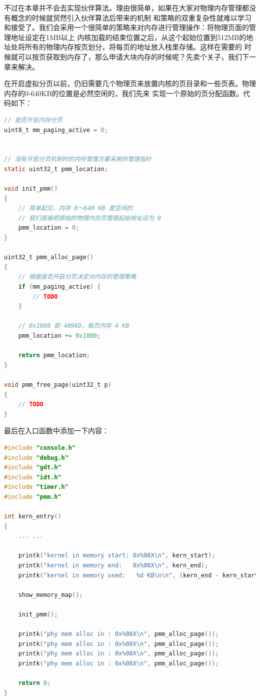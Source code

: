 \par 不过在本章并不会去实现伙伴算法。理由很简单，如果在大家对物理内存管理都没有概念的时候就贸然引入伙伴算法后带来的机制\allowbreak
和策略的双重复杂性就难以学习和接受了。我们会采用一个很简单的策略来对内存进行管理操作：将物理页面的管理地址设定在1MB以上\allowbreak
内核加载的结束位置之后，从这个起始位置到512MB的地址处将所有的物理内存按页划分，将每页的地址放入栈里存储。这样在需要的\allowbreak
时候就可以按页获取到内存了，那么申请大块内存的时候呢？先卖个关子，我们下一章来解决。

\par 在开启虚拟分页以前，仍旧需要几个物理页来放置内核的页目录和一些页表。物理内存的0-640KB的位置是必然空闲的，我们先来\allowbreak
实现一个原始的页分配函数。代码如下：

\begin{lstlisting}[language = C, caption = mm/pmm.c]
// 是否开启内存分页
uint8_t mm_paging_active = 0;


// 没有开启分页机制时的内存管理方案采用的管理指针
static uint32_t pmm_location;

void init_pmm()
{
	// 简单起见，内存 0～640 KB 是空闲的
	// 我们直接把原始的物理内存页管理起始地址设为 0
	pmm_location = 0;
}

uint32_t pmm_alloc_page()
{
	// 根据是否开启分页决定对内存的管理策略
	if (mm_paging_active) {
		// TODO
	}

	// 0x1000 即 4096D，每页内存 4 KB
	pmm_location += 0x1000;

	return pmm_location;
}

void pmm_free_page(uint32_t p)
{
	// TODO
}

\end{lstlisting}

\par 最后在入口函数中添加一下内容：

\begin{lstlisting}[language = C, caption = init/entry.c]
#include "console.h"
#include "debug.h"
#include "gdt.h"
#include "idt.h"
#include "timer.h"
#include "pmm.h"

int kern_entry()
{
	... ...

	printk("kernel in memory start: 0x%08X\n", kern_start);
	printk("kernel in memory end:   0x%08X\n", kern_end);
	printk("kernel in memory used:   %d KB\n\n", (kern_end - kern_start + 1023) / 1024);
	
	show_memory_map();

	init_pmm();

	printk("phy mem alloc in : 0x%08X\n", pmm_alloc_page());
	printk("phy mem alloc in : 0x%08X\n", pmm_alloc_page());
	printk("phy mem alloc in : 0x%08X\n", pmm_alloc_page());
	printk("phy mem alloc in : 0x%08X\n", pmm_alloc_page());

	return 0;
}
\end{lstlisting}

